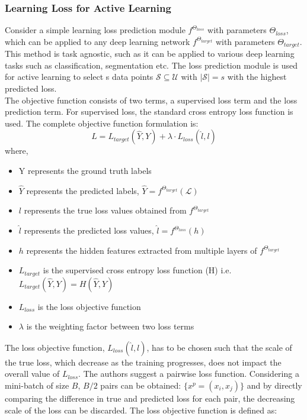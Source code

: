 \subsubsection{Learning Loss for Active Learning\cite{yoo2019}}
Consider a simple learning loss prediction module $f^{\Theta_{loss}}$ with parameters $\Theta_{loss}$, which can be applied to any deep learning network $f^{\Theta_{target}}$ with parameters $\Theta_{target}$. This method is task agnostic, such as it can be applied to various deep learning tasks such as classification, segmentation etc. The loss prediction module is used for active learning to select s data points $\mathcal{S} \subseteq \mathcal{U}$ with $|\mathcal{S}| = s$ with the highest predicted loss. \\
The objective function consists of two terms, a supervised loss term and the loss prediction term. For supervised loss, the standard cross entropy loss function\cite{cox1958} is used. The complete objective function formulation is:
\begin{equation}
    \label{equation:learning_loss_full_loss}
    L = L_{target}(\hat{Y}, Y) + \lambda \cdot L_{loss}(\hat{l}, l)
\end{equation}
where,
\begin{itemize}[label={}]
  \setlength\itemsep{0em}
  \item Y represents the ground truth labels
  \item $\hat{Y}$ represents the predicted labels, $\hat{Y} = f^{\Theta_{target}}(\mathcal{L})$
  \item $l$ represents the true loss values obtained from $f^{\Theta_{target}}$
  \item $\hat{l}$ represents the predicted loss values, $\hat{l} = f^{\Theta_{loss}}(h)$
  \item $h$ represents the hidden features extracted from multiple layers of $f^{\Theta_{target}}$
  \item $L_{target}$ is the supervised cross entropy loss function (H) i.e. $L_{target}(\hat{Y}, Y) = H(\hat{Y}, Y)$
  \item $L_{loss}$ is the loss objective function
  \item $\lambda$ is the weighting factor between two loss terms
\end{itemize}
The loss objective function, $L_{loss}(\hat{l}, l)$, has to be chosen such that the scale of the true loss, which decrease as the training progresses, does not impact the overall value of $L_{loss}$. The authors suggest a pairwise loss function. Considering a mini-batch of size $B$, $B/2$ pairs can be obtained: $\{x^p = (x_i, x_j)\}$ and by directly comparing the difference in true and predicted loss for each pair, the decreasing scale of the loss can be discarded. The loss objective function is defined as:
